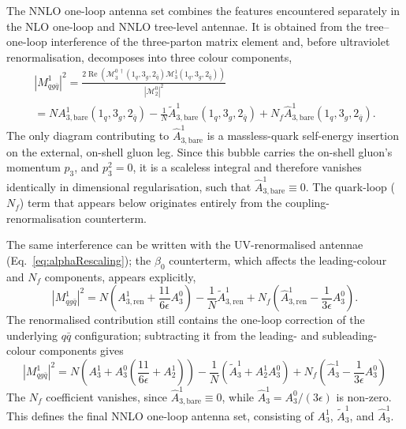 The NNLO one-loop antenna set combines the features encountered separately in
the NLO one-loop and NNLO tree-level antennae. It is obtained from the
tree--one-loop interference of the three-parton matrix element and, before
ultraviolet renormalisation, decomposes into three colour components,
\begin{equation}
    \begin{gathered}
        |M_{qg\bar q}^1|^2 = \frac{2\operatorname{Re}\!\left(\mathcal M_3^{0\,\dagger}(1_q,3_g,2_{\bar q})\mathcal M_3^1(1_q,3_g,2_{\bar q})\right)}{|\mathcal M_2^0|^2}\\
        = NA_{3,\text{bare}}^1(1_q,3_g,2_{\bar q}) - \frac1N \tilde A_{3,\text{bare}}^1(1_q,3_g,2_{\bar q}) + N_f\hat A_{3,\text{bare}}^1(1_q,3_g,2_{\bar q}).
    \end{gathered}
\end{equation}
The only diagram contributing to $\hat A_{3,\text{bare}}^1$ is a massless-quark
self-energy insertion on the external, on-shell gluon leg. Since this bubble
carries the on-shell gluon's momentum $p_3$, and $p_3^2=0$, it is a scaleless
integral and therefore vanishes identically in dimensional regularisation, such that
$\hat A_{3,\text{bare}}^1\equiv0$. The quark-loop ($N_f$) term that appears below 
originates entirely from the coupling-renormalisation counterterm.

The same interference can be written with the UV-renormalised antennae (Eq.~\eqref{eq:alphaRescaling}); the $\beta_0$ counterterm, which affects the leading-colour and $N_f$ components, appears explicitly,
\begin{equation}
    |M_{qg\bar q}^1|^2 = N\!\left(A_{3,\text{ren}}^1+\frac{11}{6\epsilon}A_3^0\right)-\frac1N\tilde A_{3,\text{ren}}^1+N_f\!\left(\hat A_{3,\text{ren}}^1-\frac{1}{3\epsilon}A_3^0\right).
\end{equation}
The renormalised contribution still contains the one-loop correction of the underlying $q\bar q$ configuration; subtracting it from the leading- and subleading-colour components gives
\begin{equation}
    |M_{qg\bar q}^1|^2 = N\!\left(A_{3}^1+A_3^0\left(\frac{11}{6\epsilon}+A_2^1\right)\right)-\frac1N\left(\tilde A_{3}^1+A_2^1A_3^0\right)+N_f\!\left(\hat A_{3}^1-\frac{1}{3\epsilon}A_3^0\right)
\end{equation}
The $N_f$ coefficient vanishes, since $\hat A_{3,\text{bare}}^1\equiv0$, while $\hat A_3^1=A_3^0/(3\epsilon)$ is non-zero. This defines the final NNLO one-loop antenna set, consisting of $A_3^1$, $\tilde A_3^1$, and $\hat A_3^1$.

